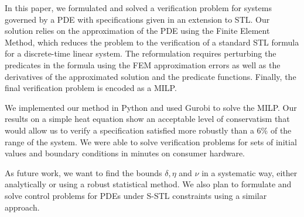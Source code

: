 \documentclass[letterpaper, 10 pt, conference]{ieeeconf/ieeeconf}
\begin{document}
In this paper, we formulated and solved a verification problem for systems governed by a
PDE with specifications given in an extension to STL. Our solution relies
on the approximation of the PDE using the Finite Element Method, which reduces
the problem to the verification of a standard STL formula for a discrete-time
linear system. The reformulation requires perturbing the predicates in the
formula using the FEM approximation errors as well as the derivatives of the
approximated solution and the predicate functions. Finally, the final
verification problem is encoded as a MILP.

We implemented our method in Python and used Gurobi to solve the MILP. Our
results on a simple heat equation show an acceptable level of conservatism that
would allow us to verify a specification satisfied more robustly than a 6\% of the range of
the system. We were able to solve verification problems for sets of initial
values and boundary conditions in minutes on consumer hardware.

As future work, we want to find the bounds $\delta, \eta$ and $\nu$ in a
systematic way, either analytically or using a robust statistical method. We
also plan to formulate and solve control problems for PDEs under S-STL constraints
using a similar approach.



\end{document}
